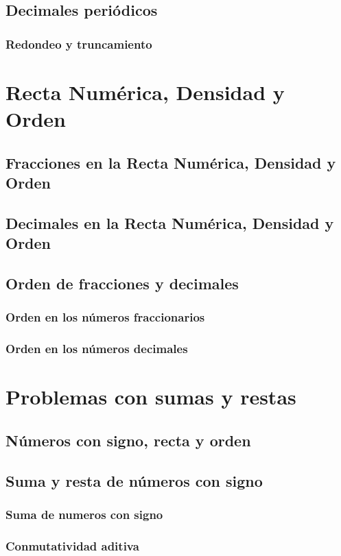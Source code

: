 \documentclass[11pt]{book}
\begin{document}
\subsection{Decimales peri\'odicos}
\subsubsection{Redondeo y truncamiento}

\section{Recta Num\'erica, Densidad y Orden}
\subsection{Fracciones en la Recta Num\'erica, Densidad y Orden}
\subsection{Decimales en la Recta Num\'erica, Densidad y Orden}
\subsection{Orden de fracciones y decimales}
\subsubsection{Orden en los n\'umeros fraccionarios}
\subsubsection{Orden en los n\'umeros decimales}

\section{Problemas con sumas y restas}
\subsection{N\'umeros con signo, recta y orden}
\subsection{Suma y resta de n\'umeros con signo}
\subsubsection{Suma de numeros con signo}
\subsubsection{Conmutatividad aditiva}
\end{document}
